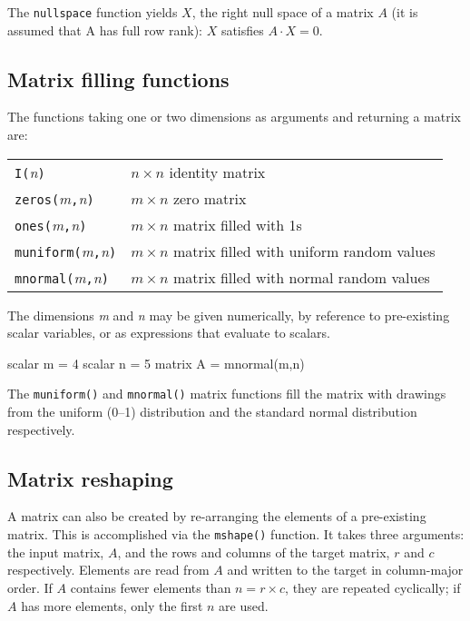 The \texttt{nullspace} function yields $X$, the right null space of a
matrix $A$ (it is assumed that A has full row rank): $X$ satisfies $A
\cdot X = 0$.


\subsection{Matrix filling functions}
\label{matrix-fill}

The functions taking one or two dimensions as arguments and returning
a matrix are:

\begin{center}
\begin{tabular}{ll}
\texttt{I(}\textsl{n}\texttt{)} & $n\times n$ identity matrix \\
\texttt{zeros(}\textsl{m}\texttt{,}\textsl{n}\texttt{)} & 
   $m\times n$ zero matrix \\
\texttt{ones(}\textsl{m}\texttt{,}\textsl{n}\texttt{)} &
   $m\times n$ matrix filled with 1s \\
\texttt{muniform(}\textsl{m}\texttt{,}\textsl{n}\texttt{)} &
   $m\times n$ matrix filled with uniform random values \\
\texttt{mnormal(}\textsl{m}\texttt{,}\textsl{n}\texttt{)} &
   $m\times n$ matrix filled with normal random values \\
\end{tabular}
\end{center}

The dimensions \textsl{m} and \textsl{n} may be given numerically, 
by reference to pre-existing scalar variables, or as expressions that
evaluate to scalars.  
%
\begin{code}
scalar m = 4
scalar n = 5
matrix A = mnormal(m,n)
\end{code}
%
The \texttt{muniform()} and \texttt{mnormal()} matrix functions fill the
matrix with drawings from the uniform (0--1) distribution and the
standard normal distribution respectively.

\subsection{Matrix reshaping}
\label{matrix-mshape}

A matrix can also be created by re-arranging the elements of a
pre-existing matrix. This is accomplished via the \texttt{mshape()}
function. It takes three arguments: the input matrix, $A$, and the
rows and columns of the target matrix, $r$ and $c$ respectively.
Elements are read from $A$ and written to the target in column-major
order.  If $A$ contains fewer elements than $n = r \times c$, they are
repeated cyclically; if $A$ has more elements, only the first $n$ are
used.

